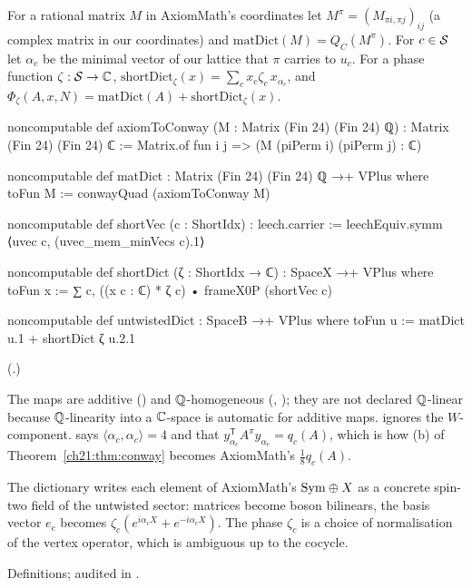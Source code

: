 \begin{definition}\label{ch21:def:dict}
For a rational matrix $M$ in AxiomMath's coordinates let $M^\pi=(M_{\pi i,\pi j})_{ij}$ (a complex
matrix in our coordinates) and $\mathrm{matDict}(M)=Q_C(M^\pi)$.  For $c\in\mathcal{S}$ let $\alpha_c$ be the
minimal vector of our lattice that $\pi$ carries to $u_c$.  For a phase function $\zeta:\mathcal{S}\to{\mathbb{C}}$,
$\mathrm{shortDict}_\zeta(x)=\sum_cx_c\zeta_c\,x_{\alpha_c}$, and
$\Phi_\zeta(A,x,N)=\mathrm{matDict}(A)+\mathrm{shortDict}_\zeta(x)$.
\end{definition}
\begin{leancode}
noncomputable def axiomToConway (M : Matrix (Fin 24) (Fin 24) ℚ) : Matrix (Fin 24) (Fin 24) ℂ :=
  Matrix.of fun i j => (M (piPerm i) (piPerm j) : ℂ)
\end{leancode}
\begin{leancode}
noncomputable def matDict : Matrix (Fin 24) (Fin 24) ℚ →+ VPlus where
  toFun M := conwayQuad (axiomToConway M)
\end{leancode}
\begin{leancode}
noncomputable def shortVec (c : ShortIdx) : leech.carrier :=
  leechEquiv.symm ⟨uvec c, (uvec_mem_minVecs c).1⟩
\end{leancode}
\begin{leancode}
noncomputable def shortDict (ζ : ShortIdx → ℂ) : SpaceX →+ VPlus where
  toFun x := ∑ c, ((x c : ℂ) * ζ c) • frameX0P (shortVec c)
\end{leancode}
\begin{leancode}
noncomputable def untwistedDict : SpaceB →+ VPlus where
  toFun u := matDict u.1 + shortDict ζ u.2.1
\end{leancode}
(.)
\begin{dictionary}
The maps are additive () and ${\mathbb{Q}}$-homogeneous (, );
they are not declared ${\mathbb{Q}}$-linear because ${\mathbb{Q}}$-linearity into a ${\mathbb{C}}$-space is automatic for additive maps.
 ignores the $W$-component.   says
$\langle\alpha_c,\alpha_c\rangle=4$ and  that
$y_{\alpha_c}^{\mathsf T}A^\pi y_{\alpha_c}=q_c(A)$, which is how (b) of
Theorem~\ref{ch21:thm:conway} becomes AxiomMath's $\tfrac18q_c(A)$.
\end{dictionary}
\begin{physics}
The dictionary writes each element of AxiomMath's $\mathrm{Sym}\oplus X$ as a concrete spin-two field of the
untwisted sector: matrices become boson bilinears, the basis vector $e_c$ becomes
$\zeta_c(e^{i\alpha_cX}+e^{-i\alpha_cX})$.  The phase $\zeta_c$ is a choice of normalisation of the
vertex operator, which is ambiguous up to the cocycle.
\end{physics}
\begin{status}
Definitions; audited in .
\end{status}

